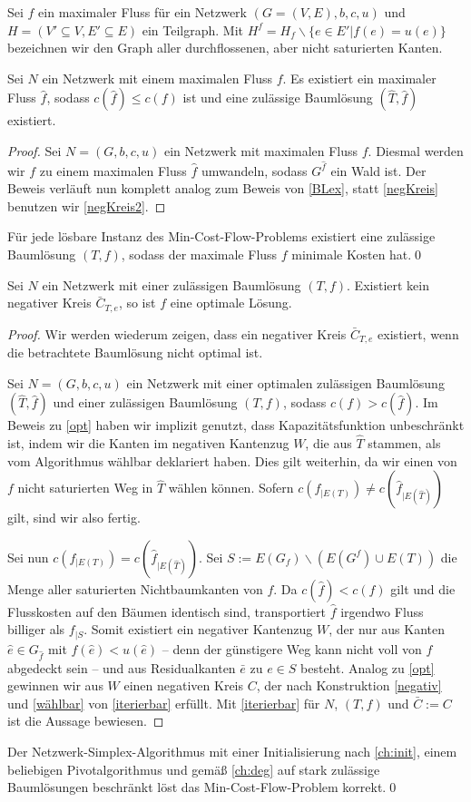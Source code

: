 \begin{nota}Sei $f$ ein maximaler Fluss für ein Netzwerk $(G=(V,E),b,c,u)$ und $H=(V'\subseteq V, E'\subseteq E)$ ein Teilgraph. Mit $H^f=H_f\backslash\{e\in E'|f(e)=u(e)\}$ bezeichnen wir den Graph aller durchflossenen, aber nicht saturierten Kanten.\end{nota}

\begin{thm}\label{BLex2}Sei $N$ ein Netzwerk mit einem maximalen Fluss $f$. Es existiert ein maximaler Fluss $\hat{f}$, sodass $c(\hat{f})\leq c(f)$ ist und eine zulässige Baumlösung $(\hat{T},\hat{f})$ existiert.\end{thm}
\begin{proof}Sei $N=(G,b,c,u)$ ein Netzwerk mit maximalen Fluss $f$. Diesmal werden wir $f$ zu einem maximalen Fluss $\hat{f}$ umwandeln, sodass $G^{\hat{f}}$ ein Wald ist. Der Beweis verläuft nun komplett analog zum Beweis von \cref{BLex}, statt \cref{negKreis} benutzen wir \cref{negKreis2}.\end{proof}

\begin{kor}Für jede lösbare Instanz des Min-Cost-Flow-Problems existiert eine zulässige Baumlösung $(T,f)$, sodass der maximale Fluss $f$ minimale Kosten hat.\qed\end{kor}

\begin{thm}\label{opt2}Sei $N$ ein Netzwerk mit einer zulässigen Baumlösung $(T,f)$. Existiert kein negativer Kreis $\bar{C}_{T,e}$, so ist $f$ eine optimale Lösung.\end{thm}
\begin{proof}Wir werden wiederum zeigen, dass ein negativer Kreis $\bar{C}_{T,e}$ existiert, wenn die betrachtete Baumlösung nicht optimal ist.

Sei $N=(G,b,c,u)$ ein Netzwerk mit einer optimalen zulässigen Baumlösung $(\hat{T},\hat{f})$ und einer zulässigen Baumlösung $(T,f)$, sodass $c(f)>c(\hat{f})$. Im Beweis zu \cref{opt} haben wir implizit genutzt, dass Kapazitätsfunktion unbeschränkt ist, indem wir die Kanten im negativen Kantenzug $W$, die aus $\hat{T}$ stammen, als vom Algorithmus wählbar deklariert haben. Dies gilt weiterhin, da wir einen von $f$ nicht saturierten Weg in $\hat{T}$ wählen können. Sofern $c(f_{|E(T)})\neq c(\hat{f}_{|E(\hat{T})})$ gilt, sind wir also fertig.

Sei nun $c(f_{|E(T)})=c(\hat{f}_{|E(\hat{T})})$. Sei $S:=E(G_f)\backslash (E(G^f)\cup E(T))$ die Menge aller saturierten Nichtbaumkanten von $f$. Da $c(\hat{f})<c(f)$ gilt und die Flusskosten auf den Bäumen identisch sind, transportiert $\hat{f}$ irgendwo Fluss billiger als $f_{|S}$. Somit existiert ein negativer Kantenzug $W$, der nur aus Kanten $\hat{e}\in G_{\hat{f}}$ mit $f(\hat{e})<u(\hat{e})$ -- denn der günstigere Weg kann nicht voll von $f$ abgedeckt sein -- und aus Residualkanten $\bar{e}$ zu $e\in S$ besteht. Analog zu \cref{opt} gewinnen wir aus $W$ einen negativen Kreis $C$, der nach Konstruktion \cref{negativ} und \cref{wählbar} von \cref{iterierbar} erfüllt. Mit \cref{iterierbar} für $N$, $(T,f)$ und $\bar{C}:=C$ ist die Aussage bewiesen.
\end{proof}

\begin{kor}Der Netzwerk-Simplex-Algorithmus mit einer Initialisierung nach \cref{ch:init}, einem beliebigen Pivotalgorithmus und gemäß \cref{ch:deg} auf stark zulässige Baumlösungen beschränkt löst das Min-Cost-Flow-Problem korrekt.\qed\end{kor}